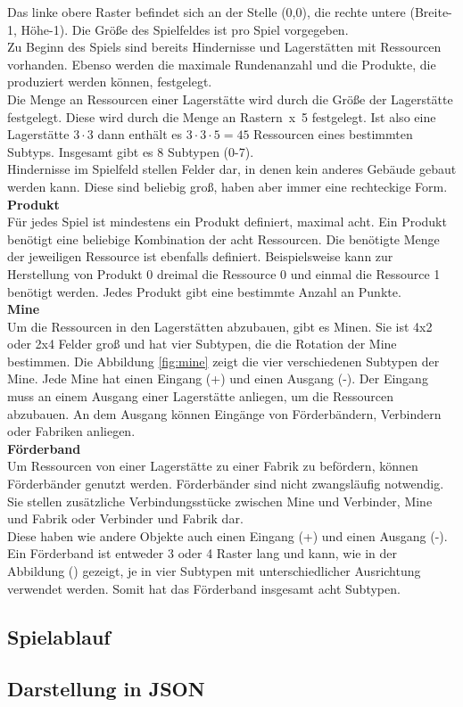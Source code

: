 Das linke obere Raster befindet sich an der Stelle (0,0), die rechte untere (Breite-1, Höhe-1). Die Größe des Spielfeldes ist pro Spiel vorgegeben.
\\
Zu Beginn des Spiels sind bereits Hindernisse und Lagerstätten mit Ressourcen vorhanden.
Ebenso werden die maximale Rundenanzahl und die Produkte, die produziert werden können, festgelegt.
\\
Die Menge an Ressourcen einer Lagerstätte wird durch die Größe der Lagerstätte festgelegt. Diese wird durch die Menge an Rastern~x~5 festgelegt. Ist also eine Lagerstätte $3 \cdot 3$  dann enthält es $3 \cdot 3\cdot 5 = 45$ Ressourcen eines bestimmten Subtyps. Insgesamt gibt es 8 Subtypen (0-7).
\\
Hindernisse im Spielfeld stellen Felder dar, in denen kein anderes Gebäude gebaut werden kann. Diese sind beliebig groß, haben aber immer eine rechteckige Form. 
\\
\textbf{Produkt}\\
Für jedes Spiel ist mindestens ein Produkt definiert, maximal acht. Ein Produkt benötigt eine beliebige Kombination der acht Ressourcen. Die benötigte Menge der jeweiligen Ressource ist ebenfalls definiert. Beispielsweise kann zur Herstellung von Produkt 0 dreimal die Ressource 0 und einmal die Ressource 1 benötigt werden. Jedes Produkt gibt eine bestimmte Anzahl an Punkte.
\\
\textbf{Mine}\\
Um die Ressourcen in den Lagerstätten abzubauen, gibt es Minen. Sie ist 4x2 oder 2x4 Felder groß und hat vier Subtypen, die die Rotation der Mine bestimmen. Die Abbildung \ref{fig:mine} zeigt die vier verschiedenen Subtypen der Mine.
Jede Mine hat einen Eingang (+) und einen Ausgang (-). Der Eingang muss an einem Ausgang einer Lagerstätte anliegen, um die Ressourcen abzubauen. An dem Ausgang können Eingänge von Förderbändern, Verbindern oder Fabriken anliegen. 
\\
\textbf{Förderband}\\
Um Ressourcen von einer Lagerstätte zu einer Fabrik zu befördern, können Förderbänder genutzt werden. Förderbänder sind nicht zwangsläufig notwendig. Sie stellen zusätzliche Verbindungsstücke zwischen Mine und Verbinder, Mine und Fabrik oder Verbinder und Fabrik dar.
\\
Diese haben wie andere Objekte auch einen Eingang (+) und einen Ausgang (-). Ein Förderband ist entweder 3 oder 4 Raster lang und kann, wie in der Abbildung () gezeigt, je in vier Subtypen mit unterschiedlicher Ausrichtung verwendet werden. Somit hat das Förderband insgesamt acht Subtypen.


\subsection{Spielablauf}

\subsection{Darstellung in JSON}